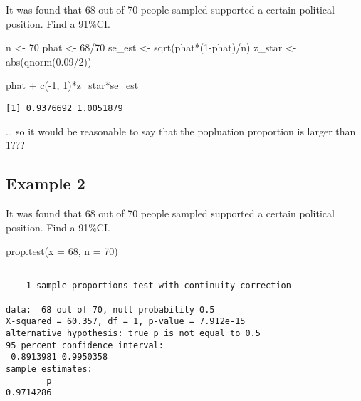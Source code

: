 \documentclass[
  letterpaper,
  DIV=11,
  numbers=noendperiod]{scrreprt}
\newenvironment{Shaded}{\begin{snugshade}}{\end{snugshade}}
\newcommand{\AttributeTok}[1]{\textcolor[rgb]{0.40,0.45,0.13}{#1}}
\newcommand{\DecValTok}[1]{\textcolor[rgb]{0.68,0.00,0.00}{#1}}
\newcommand{\FloatTok}[1]{\textcolor[rgb]{0.68,0.00,0.00}{#1}}
\newcommand{\FunctionTok}[1]{\textcolor[rgb]{0.28,0.35,0.67}{#1}}
\newcommand{\NormalTok}[1]{\textcolor[rgb]{0.00,0.23,0.31}{#1}}
\newcommand{\OtherTok}[1]{\textcolor[rgb]{0.00,0.23,0.31}{#1}}
\newcommand{\SpecialCharTok}[1]{\textcolor[rgb]{0.37,0.37,0.37}{#1}}
\def\pause{}
\begin{document}
It was found that 68 out of 70 people sampled supported a certain
political position. Find a 91\%CI.\pause

\begin{Shaded}
\begin{Highlighting}[]
\NormalTok{n }\OtherTok{\textless{}{-}} \DecValTok{70}
\NormalTok{phat }\OtherTok{\textless{}{-}} \DecValTok{68}\SpecialCharTok{/}\DecValTok{70}
\NormalTok{se\_est }\OtherTok{\textless{}{-}} \FunctionTok{sqrt}\NormalTok{(phat}\SpecialCharTok{*}\NormalTok{(}\DecValTok{1}\SpecialCharTok{{-}}\NormalTok{phat)}\SpecialCharTok{/}\NormalTok{n)}
\NormalTok{z\_star }\OtherTok{\textless{}{-}} \FunctionTok{abs}\NormalTok{(}\FunctionTok{qnorm}\NormalTok{(}\FloatTok{0.09}\SpecialCharTok{/}\DecValTok{2}\NormalTok{))}

\NormalTok{phat }\SpecialCharTok{+} \FunctionTok{c}\NormalTok{(}\SpecialCharTok{{-}}\DecValTok{1}\NormalTok{, }\DecValTok{1}\NormalTok{)}\SpecialCharTok{*}\NormalTok{z\_star}\SpecialCharTok{*}\NormalTok{se\_est}
\end{Highlighting}
\end{Shaded}

\begin{verbatim}
[1] 0.9376692 1.0051879
\end{verbatim}

\ldots{} so it would be reasonable to say that the popluation proportion
is larger than 1???

\hypertarget{example-2-2}{%
\subsection{Example 2}\label{example-2-2}}

It was found that 68 out of 70 people sampled supported a certain
political position. Find a 91\%CI.\pause

\begin{Shaded}
\begin{Highlighting}[]
\FunctionTok{prop.test}\NormalTok{(}\AttributeTok{x =} \DecValTok{68}\NormalTok{, }\AttributeTok{n =} \DecValTok{70}\NormalTok{)}
\end{Highlighting}
\end{Shaded}

\begin{verbatim}

    1-sample proportions test with continuity correction

data:  68 out of 70, null probability 0.5
X-squared = 60.357, df = 1, p-value = 7.912e-15
alternative hypothesis: true p is not equal to 0.5
95 percent confidence interval:
 0.8913981 0.9950358
sample estimates:
        p 
0.9714286 
\end{verbatim}
\end{document}
